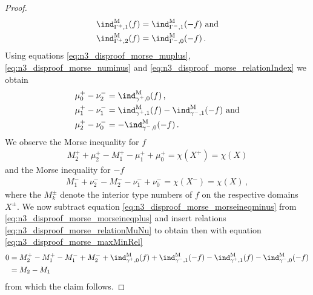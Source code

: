 \begin{proof}
\begin{equation}
\begin{aligned}
      \ind^\text{M}_{\Gamma^+,1}(f)&=\ind^\text{M}_{\Gamma^-,1}(-f)\text{ and} \\
      \ind^\text{M}_{\Gamma^+,2}(f)&=\ind^\text{M}_{\Gamma^-,0}(-f)\,.\label{eq:n3_disproof_morse_relationIndex} 
    \end{aligned}
  \end{equation}
  Using equations \eqref{eq:n3_disproof_morse_muplus}, \eqref{eq:n3_disproof_morse_numinus} and \eqref{eq:n3_disproof_morse_relationIndex}
  we obtain
  \begin{equation}
    \begin{aligned}
      \mu^+_0-\nu^-_2&=\ind^\text{M}_{\gamma^+,0}(f)\,, \\
      \mu^+_1-\nu^-_1&=\ind^\text{M}_{\gamma^+,1}(f)-\ind^\text{M}_{\gamma^-,1}(-f)\text{ and} \\
      \mu^+_2-\nu^-_0&=-\ind^\text{M}_{\gamma^-,0}(-f)\,.
    \end{aligned}\label{eq:n3_disproof_morse_relationMuNu}
  \end{equation}
  We observe the Morse inequality for $f$
  \begin{align}
    M_2^++\mu^+_2-M_1^+-\mu^+_1+\mu^+_0=\chi(X^+)=\chi(X)\label{eq:n3_disproof_morse_morseineqplus}
  \end{align}
  and the Morse inequality for $-f$
  \begin{align}
    M_1^-+\nu^-_2-M_2^--\nu^-_1+\nu^-_0=\chi(X^-)=\chi(X)\label{eq:n3_disproof_morse_morseineqminus}\,,
  \end{align}
  where the $M_k^\pm$ denote the interior type numbers of $f$ on the respective domains $X^\pm$.
  We now subtract equation \eqref{eq:n3_disproof_morse_morseineqminus} from \eqref{eq:n3_disproof_morse_morseineqplus}
  and insert relations \eqref{eq:n3_disproof_morse_relationMuNu} to obtain
  then with equation \eqref{eq:n3_disproof_morse_maxMinRel}
  \begin{align*}
    0&=M_2^+-M_1^+-M_1^-+M_2^-+\ind^\text{M}_{\gamma^+,0}(f)+\ind^\text{M}_{\gamma^-,1}(-f)-\ind^\text{M}_{\gamma^+,1}(f)-\ind^\text{M}_{\gamma^-,0}(-f) \\
    &= M_2-M_1
  \end{align*}
  from which the claim follows.



\end{proof}
